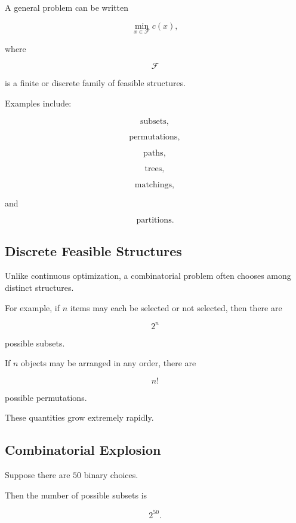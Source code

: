 A general problem can be written

\[
\boxed{
\min_{x\in\mathcal{F}}
c(x),
}
\]

where

\[
\mathcal{F}
\]

is a finite or discrete family of feasible structures.

Examples include:

\[
\boxed{
\text{subsets},
}
\]

\[
\boxed{
\text{permutations},
}
\]

\[
\boxed{
\text{paths},
}
\]

\[
\boxed{
\text{trees},
}
\]

\[
\boxed{
\text{matchings},
}
\]

and

\[
\boxed{
\text{partitions}.
}
\]

\subsection{Discrete Feasible Structures}
\label{subsec:discrete-feasible-structures}

Unlike continuous optimization, a combinatorial problem often chooses
among distinct structures.

For example, if \(n\) items may each be selected or not selected, then
there are

\[
\boxed{
2^n
}
\]

possible subsets.

If \(n\) objects may be arranged in any order, there are

\[
\boxed{
n!
}
\]

possible permutations.

These quantities grow extremely rapidly.

\subsection{Combinatorial Explosion}
\label{subsec:combinatorial-explosion}

Suppose there are \(50\) binary choices.

Then the number of possible subsets is

\[
\boxed{
2^{50}.
}
\]

